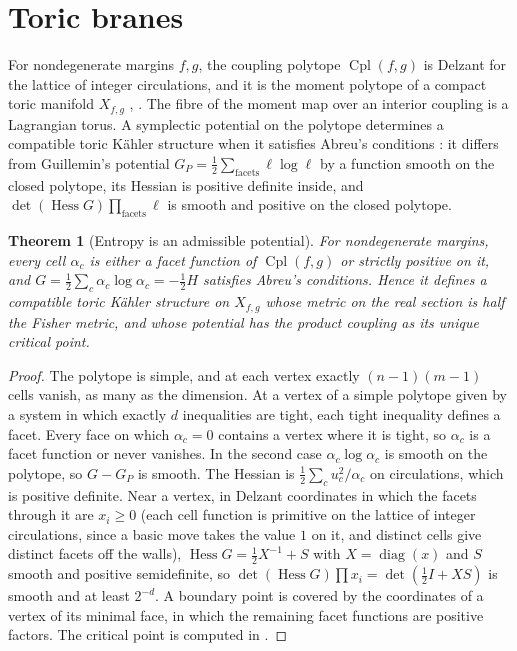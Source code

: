 \documentclass[11pt]{article}
\newtheorem{theorem}{Theorem}[section]
\theoremstyle{definition}
\theoremstyle{remark}
\newcommand{\Cpl}{\operatorname{Cpl}}
\newcommand{\diag}{\operatorname{diag}}
\newcommand{\Hess}{\operatorname{Hess}}
\begin{document}
\section{Toric branes}\label{sec:toric}

For nondegenerate margins $f,g$, the coupling polytope $\Cpl(f,g)$ is Delzant for the lattice of integer circulations, and it is
the moment polytope of a compact toric manifold $X_{f,g}$ \cite[Thm.~6.4]{Conditionals}, \cite{Delzant1988}. The fibre of the moment
map over an interior coupling is a Lagrangian torus. A symplectic potential on the polytope determines a compatible toric
Kähler structure when it satisfies Abreu's conditions \cite{Abreu2003}: it differs from Guillemin's potential
$G_P=\frac12\sum_{\text{facets}}\ell\log\ell$ \cite{Guillemin1994} by a function smooth on the closed polytope, its Hessian is
positive definite inside, and $\det(\Hess G)\prod_{\text{facets}}\ell$ is smooth and positive on the closed polytope.

\begin{theorem}[Entropy is an admissible potential]\label{thm:abreu}
For nondegenerate margins, every cell $\alpha_c$ is either a facet function of $\Cpl(f,g)$ or strictly positive on it, and
$G=\frac12\sum_c\alpha_c\log\alpha_c=-\frac12H$ satisfies Abreu's conditions. Hence it defines a compatible toric Kähler structure on
$X_{f,g}$ whose metric on the real section is half the Fisher metric, and whose potential has the product coupling as its unique
critical point.
\end{theorem}
\begin{proof}
The polytope is simple, and at each vertex exactly $(n-1)(m-1)$ cells vanish, as many as the dimension. At a vertex of a simple
polytope given by a system in which exactly $d$ inequalities are tight, each tight inequality defines a facet. Every face on which
$\alpha_c=0$ contains a vertex where it is tight, so $\alpha_c$ is a facet function or never vanishes. In the second case
$\alpha_c\log\alpha_c$ is smooth on the polytope, so $G-G_P$ is smooth. The Hessian is $\frac12\sum_c u_c^2/\alpha_c$ on circulations, which is
positive definite. Near a vertex, in Delzant coordinates in which the facets through it are $x_i\ge0$ (each cell
function is primitive on the lattice of integer circulations, since a basic move takes the value $1$ on it, and distinct cells give
distinct facets off the walls), $\Hess G=\frac12X^{-1}+S$
with $X=\diag(x)$ and $S$ smooth and positive semidefinite, so $\det(\Hess G)\prod x_i=\det(\frac12I+XS)$ is smooth and at least
$2^{-d}$. A boundary point is covered by the coordinates of a vertex of its minimal face, in which the remaining facet functions
are positive factors. The critical point is computed in \cite[Prop.~6.5]{Conditionals}.
\end{proof}
\end{document}
